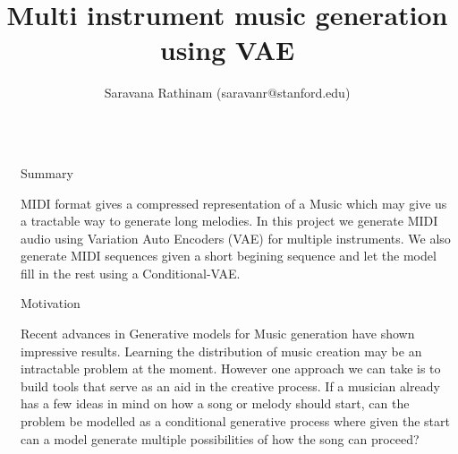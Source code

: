 \documentclass[final]{beamer}
\title{Multi instrument music generation using VAE} %
\author{Saravana Rathinam (saravanr@stanford.edu)} %
\institute{~} %
\newlength{\sepwid}
\newlength{\onecolwid}
\begin{document}

\setlength{\belowcaptionskip}{2ex} %
\setlength\belowdisplayshortskip{2ex} %

\begin{frame}[t] %

\begin{columns}[t] %

\begin{column}{\sepwid}\end{column} %

\begin{column}{\onecolwid} %


\begin{alertblock}{Summary}

MIDI format gives a compressed representation of
a Music which may give us a tractable way to generate long melodies. In this project we generate MIDI audio using Variation Auto Encoders (VAE) for multiple instruments. We also generate MIDI sequences given a short begining sequence and let the model fill in the rest using a Conditional-VAE.

\end{alertblock}

\begin{block}{Motivation}

Recent advances in Generative models
for Music generation have shown impressive results. Learning the distribution of music creation may be an intractable problem at the moment.
However one approach we can take is to build tools that serve as an aid in the creative process. If a
musician already has a few ideas in mind on how a song or melody should start, can the problem be
modelled as a conditional generative process where given the start can a model
generate multiple possibilities of how the song can proceed?
\end{block}



\end{column}
\end{columns}
\end{frame}
\end{document}
